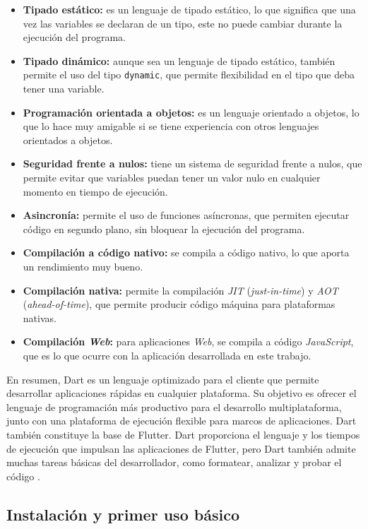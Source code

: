 \begin{itemize}
  \item \textbf{Tipado estático:} es un lenguaje de tipado estático, lo que significa que una vez las 
  variables se declaran de un tipo, este no puede cambiar durante la ejecución del programa.
  \item \textbf{Tipado dinámico:} aunque sea un lenguaje de tipado estático, también permite el uso del tipo
  \texttt{dynamic}, que permite flexibilidad en el tipo que deba tener una variable.
  \item \textbf{Programación orientada a objetos:} es un lenguaje orientado a objetos, lo que lo hace muy amigable
  si se tiene experiencia con otros lenguajes orientados a objetos.
  \item \textbf{Seguridad frente a nulos:} tiene un sistema de seguridad frente a nulos, que permite evitar que variables
puedan tener un valor nulo en cualquier momento en tiempo de ejecución.
  \item \textbf{Asincronía:} permite el uso de funciones asíncronas, que permiten ejecutar código en segundo plano, 
  sin bloquear la ejecución del programa.
  \item \textbf{Compilación a código nativo:} se compila a código nativo, lo que aporta un rendimiento muy bueno.
  \item \textbf{Compilación nativa:} permite la compilación \textit{JIT} (\textit{just-in-time}) y \textit{AOT} (\textit{ahead-of-time}), 
  que permite producir código máquina para plataformas nativas.
  \item \textbf{Compilación \textit{Web}:} para aplicaciones \textit{Web}, se compila a código
  \textit{JavaScript}, que es lo que ocurre con la aplicación desarrollada en este trabajo.
\end{itemize}

En resumen, Dart es un lenguaje optimizado para el cliente que permite desarrollar aplicaciones rápidas en cualquier 
plataforma. Su objetivo es ofrecer el lenguaje de programación más productivo para el desarrollo 
multiplataforma, junto con una plataforma de ejecución flexible para marcos de aplicaciones. 
Dart también constituye la base de Flutter. Dart proporciona el lenguaje y los tiempos de ejecución 
que impulsan las aplicaciones de Flutter, pero Dart también admite muchas tareas básicas del desarrollador, 
como formatear, analizar y probar el código \cite{dart_overview}.

\subsection{Instalación y primer uso básico\label{SEC:INSTALACION}}

